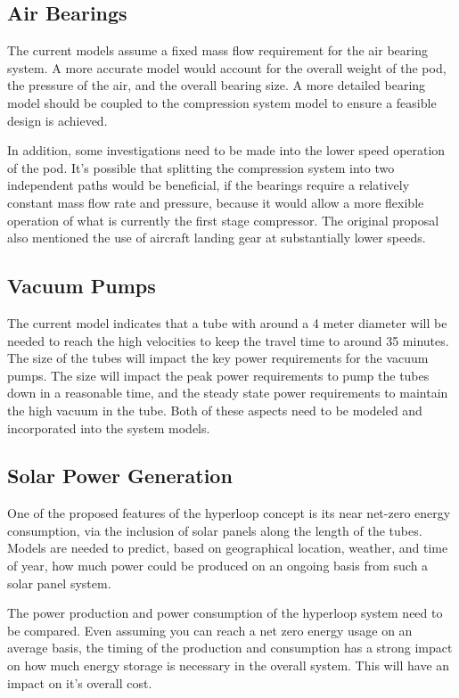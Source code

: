 \documentclass[heading.tex]{subfiles}
\begin{document}
\subsection{Air Bearings}
The current models assume a fixed mass flow requirement for the air bearing system. A more accurate model would account for the overall
weight of the pod, the pressure of the air, and the overall bearing size. A more detailed bearing model should be coupled to the
compression system model to ensure a feasible design is achieved.

In addition, some investigations need to be made into the lower speed operation of the pod. It's possible that splitting the compression
system into two independent paths would be beneficial, if the bearings require a relatively constant mass flow rate and pressure, because it
would allow a more flexible operation of what is currently the first stage compressor.
The original proposal also mentioned the use of aircraft landing gear at substantially lower speeds.


\subsection{Vacuum Pumps}
The current model indicates that a tube with around a 4 meter diameter will be needed to reach the high velocities to keep the travel time
to around 35 minutes. The size of the tubes will impact the key power requirements for the vacuum pumps.
The size will impact the peak power requirements to pump the tubes down in a reasonable time,
and the steady state power requirements to maintain the high vacuum in the tube.
Both of these aspects need to be modeled and incorporated into the system models.


\subsection{Solar Power Generation}
One of the proposed features of the hyperloop concept is its near net-zero energy consumption, via the inclusion of solar panels along the
length of the tubes. Models are needed to predict, based on geographical location, weather, and time of year, how much power could be
produced on an ongoing basis from such a solar panel system.

The power production and power consumption of the hyperloop system need to be compared. Even assuming you can reach a net zero
energy usage on an average basis, the timing of the production and consumption has a strong impact on how much energy storage is
necessary in the overall system. This will have an impact on it's overall cost.
\end{document}
